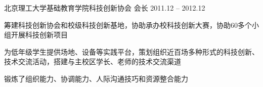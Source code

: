 


\begin{cventries}


\ljyhuodong
{} %
{北京理工大学基础教育学院科技创新协会} %
{会长} %
{2011.12 -- 2012.12} %
{ %
\begin{cvitems}
\item {筹建科技创新协会和校级科技创新基地，协助承办校科技创新大赛，协助60多个小组开展科技创新项目}
\item {为低年级学生提供场地、设备等实践平台，策划组织近百场多种形式的科技创新、技术交流活动，搭建与主校区学长、老师的技术交流渠道}
\item {锻炼了组织能力、协调能力、人际沟通技巧和资源整合能力}
\end{cvitems}
}


\end{cventries}


